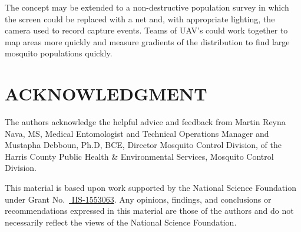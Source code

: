 \documentclass[letterpaper, 10 pt, conference]{ieeeconf}  %
\begin{document}
The concept may be extended to a non-destructive population survey in which the screen could be replaced with a net and, with appropriate lighting, the camera used to record capture events.  Teams of UAV's could work together to map areas more quickly and measure gradients of the distribution to find large mosquito populations quickly.



\section*{ACKNOWLEDGMENT}
The authors acknowledge the helpful advice and feedback from Martin Reyna Nava, MS, Medical Entomologist and Technical Operations Manager and Mustapha Debboun, Ph.D, BCE, Director Mosquito Control Division, of the Harris County Public Health \& Environmental Services, Mosquito Control Division.

This material is based upon work supported by the National Science Foundation under Grant No.\ 
\href{http://nsf.gov/awardsearch/showAward?AWD_ID=1553063}{ IIS-1553063}.
Any opinions, findings, and conclusions or recommendations expressed in this material are those of the authors and do not necessarily reflect the views of the National Science Foundation.





%

%
%
%
%
%
%
\end{document}

